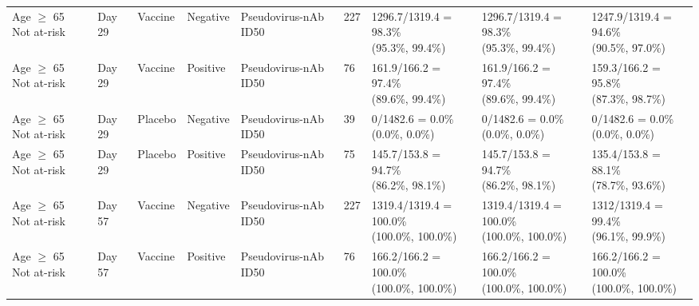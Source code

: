 \documentclass[]{book}
\theoremstyle{definition}
\theoremstyle{definition}
\theoremstyle{definition}
\newcommand{\1}{\mathbbm{1}}
\begin{document}
\begin{landscape}
\begin{ThreePartTable}
\begin{longtable}[t]{>{\raggedright\arraybackslash}p{2.7cm}llllllll}
\hspace{1em}Age $\geq$ 65 Not at-risk & Day 29 & Vaccine & Negative & Pseudovirus-nAb ID50 & 227 & \makecell[l]{1296.7/1319.4 = 98.3\%\\(95.3\%, 99.4\%)} & \makecell[l]{1296.7/1319.4 = 98.3\%\\(95.3\%, 99.4\%)} & \makecell[l]{1247.9/1319.4 = 94.6\%\\(90.5\%, 97.0\%)}\\
\hspace{1em}Age $\geq$ 65 Not at-risk & Day 29 & Vaccine & Positive & Pseudovirus-nAb ID50 & 76 & \makecell[l]{161.9/166.2 = 97.4\%\\(89.6\%, 99.4\%)} & \makecell[l]{161.9/166.2 = 97.4\%\\(89.6\%, 99.4\%)} & \makecell[l]{159.3/166.2 = 95.8\%\\(87.3\%, 98.7\%)}\\
\hspace{1em}Age $\geq$ 65 Not at-risk & Day 29 & Placebo & Negative & Pseudovirus-nAb ID50 & 39 & \makecell[l]{0/1482.6 = 0.0\%\\(0.0\%, 0.0\%)} & \makecell[l]{0/1482.6 = 0.0\%\\(0.0\%, 0.0\%)} & \makecell[l]{0/1482.6 = 0.0\%\\(0.0\%, 0.0\%)}\\
\hspace{1em}Age $\geq$ 65 Not at-risk & Day 29 & Placebo & Positive & Pseudovirus-nAb ID50 & 75 & \makecell[l]{145.7/153.8 = 94.7\%\\(86.2\%, 98.1\%)} & \makecell[l]{145.7/153.8 = 94.7\%\\(86.2\%, 98.1\%)} & \makecell[l]{135.4/153.8 = 88.1\%\\(78.7\%, 93.6\%)}\\
\hspace{1em}Age $\geq$ 65 Not at-risk & Day 57 & Vaccine & Negative & Pseudovirus-nAb ID50 & 227 & \makecell[l]{1319.4/1319.4 = 100.0\%\\(100.0\%, 100.0\%)} & \makecell[l]{1319.4/1319.4 = 100.0\%\\(100.0\%, 100.0\%)} & \makecell[l]{1312/1319.4 = 99.4\%\\(96.1\%, 99.9\%)}\\
\hspace{1em}Age $\geq$ 65 Not at-risk & Day 57 & Vaccine & Positive & Pseudovirus-nAb ID50 & 76 & \makecell[l]{166.2/166.2 = 100.0\%\\(100.0\%, 100.0\%)} & \makecell[l]{166.2/166.2 = 100.0\%\\(100.0\%, 100.0\%)} & \makecell[l]{166.2/166.2 = 100.0\%\\(100.0\%, 100.0\%)}\\

\end{longtable}
\end{ThreePartTable}
\end{landscape}
\end{document}
